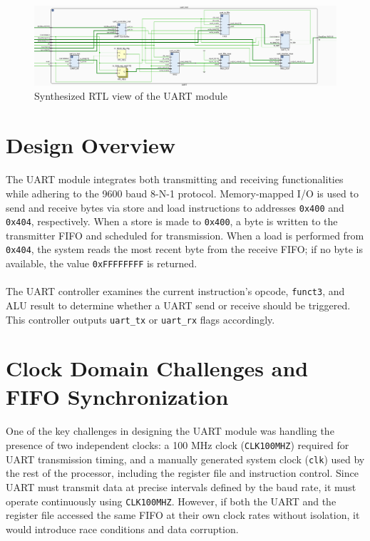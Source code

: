 \documentclass[12pt]{report}
\begin{document}
\begin{figure}[h]
    \centering
    \includegraphics[width=\textwidth]{figures/uart_rtl.png}
    \caption{Synthesized RTL view of the UART module}
    \label{fig:uart}
\end{figure}

\section*{Design Overview}

\paragraph{}
The UART module integrates both transmitting and receiving functionalities while adhering to the 9600 baud 8-N-1 protocol. Memory-mapped I/O is used to send and receive bytes via store and load instructions to addresses \texttt{0x400} and \texttt{0x404}, respectively. When a store is made to \texttt{0x400}, a byte is written to the transmitter FIFO and scheduled for transmission. When a load is performed from \texttt{0x404}, the system reads the most recent byte from the receive FIFO; if no byte is available, the value \texttt{0xFFFFFFFF} is returned.

\paragraph{}
The UART controller examines the current instruction's opcode, \texttt{funct3}, and ALU result to determine whether a UART send or receive should be triggered. This controller outputs \texttt{uart\_tx} or \texttt{uart\_rx} flags accordingly.

\section{Clock Domain Challenges and FIFO Synchronization}

\paragraph{}
One of the key challenges in designing the UART module was handling the presence of two independent clocks: a 100 MHz clock (\texttt{CLK100MHZ}) required for UART transmission timing, and a manually generated system clock (\texttt{clk}) used by the rest of the processor, including the register file and instruction control. Since UART must transmit data at precise intervals defined by the baud rate, it must operate continuously using \texttt{CLK100MHZ}. However, if both the UART and the register file accessed the same FIFO at their own clock rates without isolation, it would introduce race conditions and data corruption.
\end{document}
